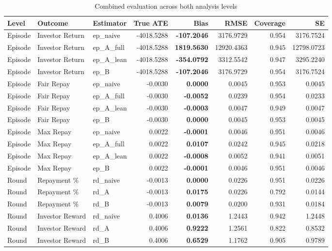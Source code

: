 \documentclass[
]{article}
\begin{document}
\begin{longtable}[t]{lllr>{}rrrr}
\caption{\label{tab:combined-table}Combined evaluation across both analysis levels}\\
\toprule
Level & Outcome & Estimator & True ATE & Bias & RMSE & Coverage & SE\\
\midrule
Episode & Investor Return & ep\_naive & -4018.5288 & \textbf{-107.2046} & 3176.9729 & 0.954 & 3176.7524\\
Episode & Investor Return & ep\_A\_full & -4018.5288 & \textbf{1819.5630} & 12920.4363 & 0.945 & 12798.0723\\
Episode & Investor Return & ep\_A\_lean & -4018.5288 & \textbf{-354.0792} & 3312.5542 & 0.947 & 3295.2240\\
Episode & Investor Return & ep\_B & -4018.5288 & \textbf{-107.2046} & 3176.9729 & 0.954 & 3176.7524\\
Episode & Fair Repay & ep\_naive & -0.0030 & \textbf{0.0000} & 0.0045 & 0.953 & 0.0045\\
\addlinespace
Episode & Fair Repay & ep\_A\_full & -0.0030 & \textbf{-0.0052} & 0.0239 & 0.954 & 0.0233\\
Episode & Fair Repay & ep\_A\_lean & -0.0030 & \textbf{-0.0003} & 0.0047 & 0.949 & 0.0047\\
Episode & Fair Repay & ep\_B & -0.0030 & \textbf{0.0000} & 0.0045 & 0.953 & 0.0045\\
Episode & Max Repay & ep\_naive & 0.0022 & \textbf{-0.0001} & 0.0046 & 0.951 & 0.0046\\
Episode & Max Repay & ep\_A\_full & 0.0022 & \textbf{0.0107} & 0.0242 & 0.945 & 0.0218\\
\addlinespace
Episode & Max Repay & ep\_A\_lean & 0.0022 & \textbf{-0.0008} & 0.0052 & 0.941 & 0.0051\\
Episode & Max Repay & ep\_B & 0.0022 & \textbf{-0.0001} & 0.0046 & 0.951 & 0.0046\\
Round & Repayment \% & rd\_naive & -0.0013 & \textbf{0.0000} & 0.0226 & 0.951 & 0.0226\\
Round & Repayment \% & rd\_A & -0.0013 & \textbf{0.0175} & 0.0226 & 0.792 & 0.0144\\
Round & Repayment \% & rd\_B & -0.0013 & \textbf{0.0079} & 0.0200 & 0.931 & 0.0184\\
\addlinespace
Round & Investor Reward & rd\_naive & 0.4006 & \textbf{0.0136} & 1.2443 & 0.942 & 1.2448\\
Round & Investor Reward & rd\_A & 0.4006 & \textbf{0.9222} & 1.2561 & 0.822 & 0.8532\\
Round & Investor Reward & rd\_B & 0.4006 & \textbf{0.6529} & 1.1762 & 0.905 & 0.9789\\
\bottomrule
\end{longtable}
\endgroup{}
\end{document}
